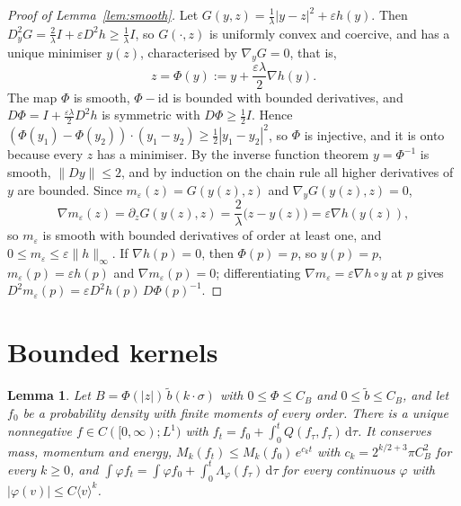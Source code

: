\documentclass[11pt]{amsart}
\newtheorem{lemma}[theorem]{Lemma}
\theoremstyle{definition}
\newcommand{\dd}{\,\mathrm{d}}
\newcommand{\jb}[1]{\langle #1\rangle}
\begin{document}
\begin{proof}[Proof of Lemma~\ref{lem:smooth}]
Let $G(y,z)=\frac1\lambda|y-z|^2+\varepsilon h(y)$. Then $D^2_yG=\frac2\lambda I+\varepsilon D^2h\ge\frac1\lambda I$, so $G(\cdot,z)$ is uniformly convex and coercive, and has a unique minimiser $y(z)$, characterised by $\nabla_yG=0$, that is,
\[
z=\Phi(y):=y+\frac{\varepsilon\lambda}2\nabla h(y).
\]
The map $\Phi$ is smooth, $\Phi-\mathrm{id}$ is bounded with bounded derivatives, and $D\Phi=I+\frac{\varepsilon\lambda}2D^2h$ is symmetric with $D\Phi\ge\frac12I$. Hence $(\Phi(y_1)-\Phi(y_2))\cdot(y_1-y_2)\ge\frac12|y_1-y_2|^2$, so $\Phi$ is injective, and it is onto because every $z$ has a minimiser. By the inverse function theorem $y=\Phi^{-1}$ is smooth, $\|Dy\|\le2$, and by induction on the chain rule all higher derivatives of $y$ are bounded. Since $m_\varepsilon(z)=G(y(z),z)$ and $\nabla_yG(y(z),z)=0$,
\[
\nabla m_\varepsilon(z)=\partial_zG(y(z),z)=\frac2\lambda\big(z-y(z)\big)=\varepsilon\nabla h(y(z)),
\]
so $m_\varepsilon$ is smooth with bounded derivatives of order at least one, and $0\le m_\varepsilon\le\varepsilon\|h\|_\infty$. If $\nabla h(p)=0$, then $\Phi(p)=p$, so $y(p)=p$, $m_\varepsilon(p)=\varepsilon h(p)$ and $\nabla m_\varepsilon(p)=0$; differentiating $\nabla m_\varepsilon=\varepsilon\nabla h\circ y$ at $p$ gives $D^2m_\varepsilon(p)=\varepsilon D^2h(p)\,D\Phi(p)^{-1}$.
\end{proof}

\section{Bounded kernels}\label{app:bounded}

\begin{lemma}\label{lem:bounded}
Let $B=\Phi(|z|)\,\tilde b(k\cdot\sigma)$ with $0\le\Phi\le C_B$ and $0\le\tilde b\le C_B$, and let $f_0$ be a probability density with finite moments of every order. There is a unique nonnegative $f\in C([0,\infty);L^1)$ with $f_t=f_0+\int_0^tQ(f_\tau,f_\tau)\dd\tau$. It conserves mass, momentum and energy, $M_k(f_t)\le M_k(f_0)\,e^{c_kt}$ with $c_k=2^{k/2+3}\pi C_B^2$ for every $k\ge0$, and $\int\varphi f_t=\int\varphi f_0+\int_0^t\Lambda_\varphi(f_\tau)\dd\tau$ for every continuous $\varphi$ with $|\varphi(v)|\le C\jb{v}^k$.
\end{lemma}
\end{document}

